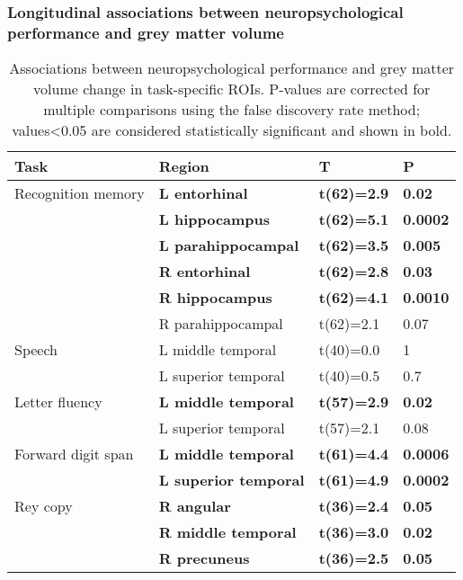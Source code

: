 \documentclass[]{article}
\begin{document}
\subsubsection*{Longitudinal associations between neuropsychological
performance and grey matter
volume}\label{longitudinal-associations-between-neuropsychological-performance-and-grey-matter-volume}

\begin{table}[ht]
\centering
\caption{Associations between neuropsychological performance and grey matter volume change in task-specific ROIs. P-values are corrected for multiple comparisons using the false discovery rate method; values<0.05 are considered statistically significant and shown in bold.} 
\begin{tabular}{llll}
  \hline
Task & Region & T & P \\ 
  \hline
Recognition memory & \textbf{L entorhinal} & \textbf{t(62)=2.9} & \textbf{0.02} \\ 
   & \textbf{L hippocampus} & \textbf{t(62)=5.1} & \textbf{0.0002} \\ 
   & \textbf{L parahippocampal} & \textbf{t(62)=3.5} & \textbf{0.005} \\ 
   & \textbf{R entorhinal} & \textbf{t(62)=2.8} & \textbf{0.03} \\ 
   & \textbf{R hippocampus} & \textbf{t(62)=4.1} & \textbf{0.0010} \\ 
   & R parahippocampal & t(62)=2.1 & 0.07 \\ 
  Speech & L middle temporal & t(40)=0.0 & 1 \\ 
   & L superior temporal & t(40)=0.5 & 0.7 \\ 
  Letter fluency & \textbf{L middle temporal} & \textbf{t(57)=2.9} & \textbf{0.02} \\ 
   & L superior temporal & t(57)=2.1 & 0.08 \\ 
  Forward digit span & \textbf{L middle temporal} & \textbf{t(61)=4.4} & \textbf{0.0006} \\ 
   & \textbf{L superior temporal} & \textbf{t(61)=4.9} & \textbf{0.0002} \\ 
  Rey copy & \textbf{R angular} & \textbf{t(36)=2.4} & \textbf{0.05} \\ 
   & \textbf{R middle temporal} & \textbf{t(36)=3.0} & \textbf{0.02} \\ 
   & \textbf{R precuneus} & \textbf{t(36)=2.5} & \textbf{0.05} \\ 

\end{tabular}
\end{table}
\end{document}
